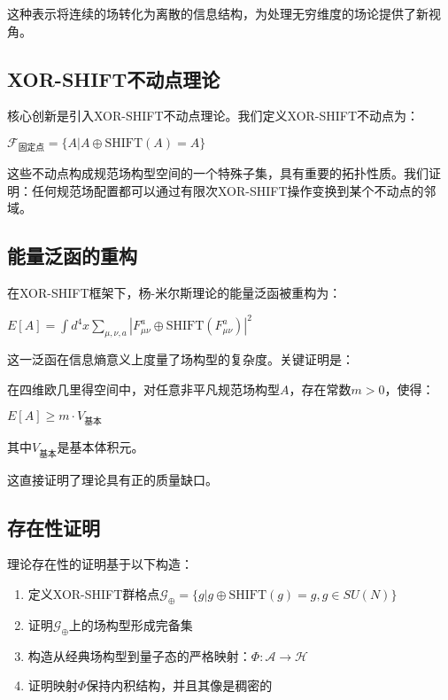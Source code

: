 这种表示将连续的场转化为离散的信息结构，为处理无穷维度的场论提供了新视角。

\subsection{XOR-SHIFT不动点理论}

核心创新是引入XOR-SHIFT不动点理论。我们定义XOR-SHIFT不动点为：

$\mathcal{F}_{\text{固定点}} = \{A | A \oplus \text{SHIFT}(A) = A\}$

这些不动点构成规范场构型空间的一个特殊子集，具有重要的拓扑性质。我们证明：任何规范场配置都可以通过有限次XOR-SHIFT操作变换到某个不动点的邻域。

\subsection{能量泛函的重构}

在XOR-SHIFT框架下，杨-米尔斯理论的能量泛函被重构为：

$E[A] = \int d^4x \sum_{\mu,\nu,a} |F_{\mu\nu}^a \oplus \text{SHIFT}(F_{\mu\nu}^a)|^2$

这一泛函在信息熵意义上度量了场构型的复杂度。关键证明是：

\begin{theorem}
在四维欧几里得空间中，对任意非平凡规范场构型$A$，存在常数$m>0$，使得：

$E[A] \geq m \cdot V_{\text{基本}}$

其中$V_{\text{基本}}$是基本体积元。
\end{theorem}

这直接证明了理论具有正的质量缺口。

\subsection{存在性证明}

理论存在性的证明基于以下构造：

\begin{enumerate}
  \item 定义XOR-SHIFT群格点$\mathcal{G}_{\oplus} = \{g | g \oplus \text{SHIFT}(g) = g, g \in SU(N)\}$
  \item 证明$\mathcal{G}_{\oplus}$上的场构型形成完备集
  \item 构造从经典场构型到量子态的严格映射：$\Phi: \mathcal{A} \to \mathcal{H}$
  \item 证明映射$\Phi$保持内积结构，并且其像是稠密的
\end{enumerate}

